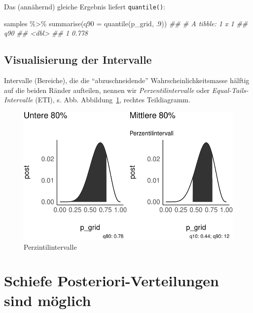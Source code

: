 \documentclass[
  a4paper,
  DIV=11]{scrreprt}
\newenvironment{Shaded}{\begin{snugshade}}{\end{snugshade}}
\newcommand{\AttributeTok}[1]{\textcolor[rgb]{0.40,0.45,0.13}{#1}}
\newcommand{\DecValTok}[1]{\textcolor[rgb]{0.68,0.00,0.00}{#1}}
\newcommand{\DocumentationTok}[1]{\textcolor[rgb]{0.37,0.37,0.37}{\textit{#1}}}
\newcommand{\FunctionTok}[1]{\textcolor[rgb]{0.28,0.35,0.67}{#1}}
\newcommand{\NormalTok}[1]{\textcolor[rgb]{0.00,0.23,0.31}{#1}}
\newcommand{\SpecialCharTok}[1]{\textcolor[rgb]{0.37,0.37,0.37}{#1}}
\theoremstyle{definition}
\theoremstyle{remark}
\begin{document}
Das (annähernd) gleiche Ergebnis liefert \texttt{quantile()}:

\begin{Shaded}
\begin{Highlighting}[]
\NormalTok{samples }\SpecialCharTok{\%\textgreater{}\%} 
  \FunctionTok{summarise}\NormalTok{(}\AttributeTok{q90 =} \FunctionTok{quantile}\NormalTok{(p\_grid, .}\DecValTok{9}\NormalTok{))}
\DocumentationTok{\#\# \# A tibble: 1 x 1}
\DocumentationTok{\#\#     q90}
\DocumentationTok{\#\#   \textless{}dbl\textgreater{}}
\DocumentationTok{\#\# 1 0.778}
\end{Highlighting}
\end{Shaded}

\hypertarget{visualisierung-der-intervalle}{%
\subsection{Visualisierung der
Intervalle}\label{visualisierung-der-intervalle}}

Intervalle (Bereiche), die die ``abzuschneidende''
Wahrscheinlichkeitsmasse hälftig auf die beiden Ränder aufteilen, nennen
wir \emph{Perzentilintervalle} oder \emph{Equal-Tails-Intervalle} (ETI),
s. Abb. Abbildung~\ref{fig-eti}, rechtes Teildiagramm.

\begin{figure}

{\centering \includegraphics{./Post_files/figure-pdf/fig-eti-1.pdf}

}

\caption{\label{fig-eti}Perzintilintervalle}

\end{figure}

\hypertarget{schiefe-posteriori-verteilungen-sind-muxf6glich}{%
\section{Schiefe Posteriori-Verteilungen sind
möglich}\label{schiefe-posteriori-verteilungen-sind-muxf6glich}}
\end{document}
